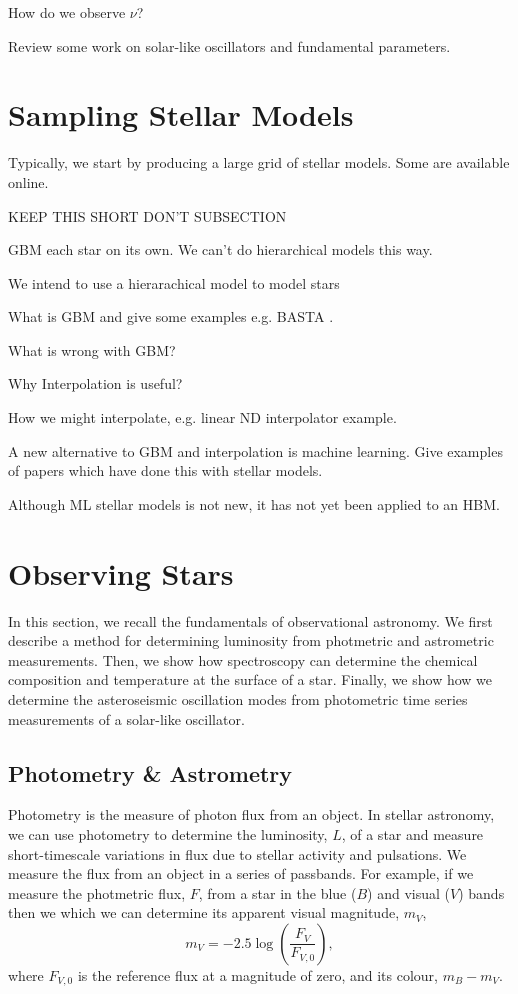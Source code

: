 How do we observe $\nu$?

Review some work on solar-like oscillators and fundamental parameters.

\section{Sampling Stellar Models}

Typically, we start by producing a large grid of stellar models. Some are available online.

KEEP THIS SHORT DON'T SUBSECTION

GBM each star on its own. We can't do hierarchical models this way.

We intend to use a hierarachical model to model stars

What is GBM and give some examples e.g. BASTA \citet{SilvaAguirre.Davies.ea2015}.

What is wrong with GBM?

Why Interpolation is useful?

How we might interpolate, e.g. linear ND interpolator example.

A new alternative to GBM and interpolation is machine learning. Give examples of papers which have done this with stellar models.

Although ML stellar models is not new, it has not yet been applied to an HBM. 

\section{Observing Stars}

In this section, we recall the fundamentals of observational astronomy. We first describe a method for determining luminosity from photmetric and astrometric measurements. Then, we show how spectroscopy can determine the chemical composition and temperature at the surface of a star. Finally, we show how we determine the asteroseismic oscillation modes from photometric time series measurements of a solar-like oscillator.

\subsection{Photometry \& Astrometry}

Photometry is the measure of photon flux from an object. In stellar astronomy, we can use photometry to determine the luminosity, $L$, of a star and measure short-timescale variations in flux due to stellar activity and pulsations. We measure the flux from an object in a series of passbands. For example, if we measure the photmetric flux, $F$, from a star in the blue ($B$) and visual ($V$) bands then we which we can determine its apparent visual magnitude, $m_V$,
\begin{equation}
    m_V = - 2.5 \log(\frac{F_V}{F_{V,0}}),
\end{equation}
where $F_{V,0}$ is the reference flux at a magnitude of zero, and its colour, $m_B - m_V$.

